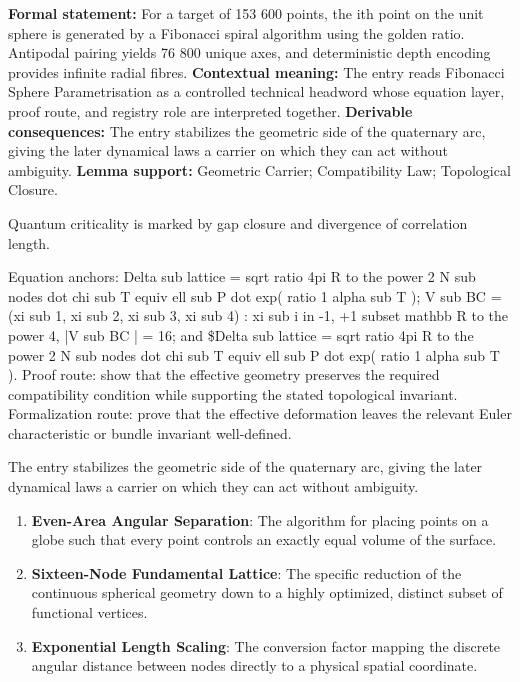 \begingroup\footnotesize\setlength{\emergencystretch}{3em}\sloppy
\textbf{Formal statement:} For a target of 153 600 points, the ith point on the unit sphere is generated by a Fibonacci spiral algorithm using the golden ratio. Antipodal pairing yields 76 800 unique axes, and deterministic depth encoding provides infinite radial fibres. \textbf{Contextual meaning:} The entry reads Fibonacci Sphere Parametrisation as a controlled technical headword whose equation layer, proof route, and registry role are interpreted together. \textbf{Derivable consequences:} The entry stabilizes the geometric side of the quaternary arc, giving the later dynamical laws a carrier on which they can act without ambiguity. \textbf{Lemma support:} Geometric Carrier; Compatibility Law; Topological Closure.\par
\endgroup

Quantum criticality is marked by gap closure and divergence of correlation length.

Equation anchors: Delta sub lattice = sqrt ratio 4pi R to the power 2 N sub nodes dot chi sub T equiv ell sub P dot exp( ratio 1 alpha sub T ); V sub BC = (xi sub 1, xi sub 2, xi sub 3, xi sub 4) : xi sub i in -1, +1 subset mathbb R to the power 4, |V sub BC | = 16; and \$Delta sub lattice = sqrt ratio 4pi R to the power 2 N sub nodes dot chi sub T equiv ell sub P dot exp( ratio 1 alpha sub T ). Proof route: show that the effective geometry preserves the required compatibility condition while supporting the stated topological invariant. Formalization route: prove that the effective deformation leaves the relevant Euler characteristic or bundle invariant well-defined.

The entry stabilizes the geometric side of the quaternary arc, giving the later dynamical laws a carrier on which they can act without ambiguity.
\endgroup

\begin{enumerate}[leftmargin=1.6em,itemsep=6pt,topsep=4pt]
\item \textbf{Even-Area Angular Separation}: The algorithm for placing points on a globe such that every point controls an exactly equal volume of the surface.
\item \textbf{Sixteen-Node Fundamental Lattice}: The specific reduction of the continuous spherical geometry down to a highly optimized, distinct subset of functional vertices.
\item \textbf{Exponential Length Scaling}: The conversion factor mapping the discrete angular distance between nodes directly to a physical spatial coordinate.
\end{enumerate}

